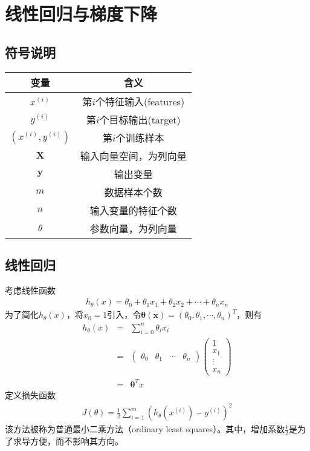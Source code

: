 \section{线性回归与梯度下降}
\subsection{符号说明}
\begin{center}
\begin{tabular}{cc}
\toprule[2pt]
变量 & 含义 \\ 
\midrule[1pt]
$x^{(i)}$ & 第$i$个特征输入(features) \\ 
$y^{(i)}$ & 第$i$个目标输出(target) \\ 
$(x^{(i)},y^{(i)})$ & 第$i$个训练样本 \\ 
$\mathbf{X}$ & 输入向量空间，为列向量 \\ 
$\mathbf{y}$ & 输出变量 \\ 
$m$ & 数据样本个数 \\
$n$ & 输入变量的特征个数\\
$\theta$ & 参数向量，为列向量\\
\bottomrule[2pt]
\end{tabular}
\end{center}


\subsection{线性回归}
考虑线性函数
\begin{eqnarray}
h_\theta(x)=\theta_0+\theta_1x_1+\theta_2x_2+\cdots+\theta_nx_n
\end{eqnarray}
为了简化$h_\theta(x)$，将$x_0=1$引入，令$\mathbf{\theta(x)}=(\theta_0,\theta_1,\cdots,\theta_n)^T$，则有
\begin{eqnarray}
h_\theta(x)
&=&\sum_{i=0}^n\theta_ix_i\\
&=&
\begin{pmatrix}
\theta_0&\theta_1&\cdots & \theta_n
\end{pmatrix}
\begin{pmatrix}
1\\
x_1\\
\vdots\\
x_n
\end{pmatrix}\\
&=&\mathbf{\theta}^Tx
\end{eqnarray}
定义损失函数
\begin{eqnarray}
J(\theta)=\frac{1}{2}\sum_{i=1}^m(h_\theta(x^{(i)})-y^{(i)})^2
\end{eqnarray}
该方法被称为普通最小二乘方法（ordinary least squares）。其中，增加系数$\frac{1}{2}$是为了求导方便，而不影响其方向。
